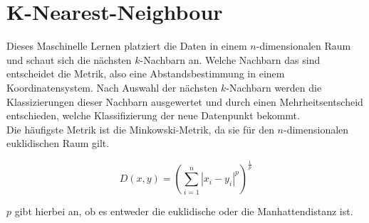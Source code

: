 \documentclass[11pt]{article} %
\begin{document}
\section{K-Nearest-Neighbour}

Dieses Maschinelle Lernen platziert die Daten in einem $n$-dimensionalen Raum und schaut sich die nächsten $k$-Nachbarn an. Welche Nachbarn das sind entscheidet die Metrik, also eine Abstandsbestimmung in einem Koordinatensystem. Nach Auswahl der nächsten $k$-Nachbarn 
werden die Klassizierungen dieser Nachbarn ausgewertet und durch einen Mehrheitsentscheid entschieden, welche Klassifizierung der
neue Datenpunkt bekommt. \\
Die häufigste Metrik ist die Minkowski-Metrik, da sie für den $n$-dimensionalen euklidischen Raum gilt.

\begin{equation}
D(x,y) = (\sum_{i=1}^n |x_i - y_i|^p )^{\frac{1}{p}}
\end{equation}

$p$ gibt hierbei an, ob es entweder die euklidische oder die Manhattendistanz ist.
\end{document}

